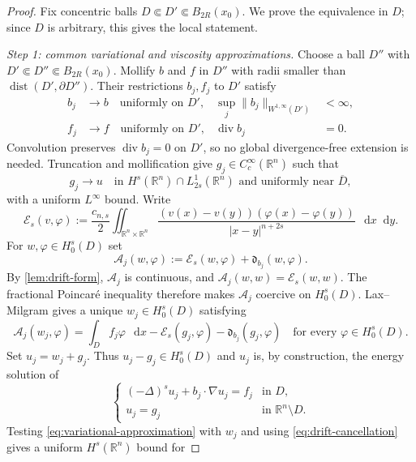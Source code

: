 \documentclass[reqno]{amsart}
\numberwithin{equation}{section}
\theoremstyle{plain}
\theoremstyle{definition}
\theoremstyle{remark}
\newcommand{\R}{\mathbb R}
\newcommand{\differential}{\mathop{}\!\mathrm d}
\DeclareMathOperator{\divergence}{div}
\begin{document}
\begin{proof}
Fix concentric balls $D\Subset D'\Subset B_{2R}(x_0)$.  We prove the
equivalence in $D$; since $D$ is arbitrary, this gives the local statement.

\smallskip
\noindent\emph{Step 1: common variational and viscosity approximations.}
\begingroup
Choose a ball $D''$ with
$D'\Subset D''\Subset B_{2R}(x_0)$.  Mollify $b$ and $f$ in $D''$ with
radii smaller than $\operatorname{dist}(D',\partial D'')$.  Their
restrictions $b_j,f_j$ to $D'$ satisfy
\begin{align*}
 b_j&\to b\quad\text{uniformly on }D',
 &\sup_j\|b_j\|_{W^{1,\infty}(D')}&<\infty,\\
 f_j&\to f\quad\text{uniformly on }D',
 &\divergence b_j&=0.
\end{align*}
Convolution preserves $\divergence b_j=0$ on $D'$, so no global
divergence-free extension is needed.  Truncation and mollification give
$g_j\in C_c^\infty(\R^n)$ such that
\[
 g_j\to u\quad\text{in }H^s(\R^n)\cap L^1_{2s}(\R^n)
 \text{ and uniformly near }\overline D,
\]
with a uniform $L^\infty$ bound.  Write
\[
 \mathcal E_s(v,\varphi):=\frac{c_{n,s}}2
 \iint_{\R^n\times\R^n}
 \frac{(v(x)-v(y))(\varphi(x)-\varphi(y))}
 {|x-y|^{n+2s}}\,\differential x\differential y.
\]
For $w,\varphi\in H_0^s(D)$ set
\[
 \mathcal A_j(w,\varphi)
 :=\mathcal E_s(w,\varphi)+\mathfrak d_{b_j}(w,\varphi).
\]
By \cref{lem:drift-form}, $\mathcal A_j$ is continuous, and
$\mathcal A_j(w,w)=\mathcal E_s(w,w)$.  The fractional Poincar\'e
inequality therefore makes $\mathcal A_j$ coercive on $H_0^s(D)$.
Lax--Milgram gives a unique $w_j\in H_0^s(D)$ satisfying
\begin{equation}\label{eq:variational-approximation}
 \mathcal A_j(w_j,\varphi)
 =\int_Df_j\varphi\,\differential x
  -\mathcal E_s(g_j,\varphi)-\mathfrak d_{b_j}(g_j,\varphi)
 \quad\text{for every }\varphi\in H_0^s(D).
\end{equation}
Set $u_j=w_j+g_j$.  Thus $u_j-g_j\in H_0^s(D)$ and $u_j$ is, by
construction, the energy solution of
\begin{equation}\label{eq:smooth-dirichlet-equivalence}
 \begin{cases}
 (-\Delta)^su_j+b_j\cdot\nabla u_j=f_j&\text{in }D,\\
 u_j=g_j&\text{in }\R^n\setminus D.
 \end{cases}
\end{equation}
Testing \eqref{eq:variational-approximation} with $w_j$ and using
\eqref{eq:drift-cancellation} gives a uniform $H^s(\R^n)$ bound for

\end{proof}
\end{document}
